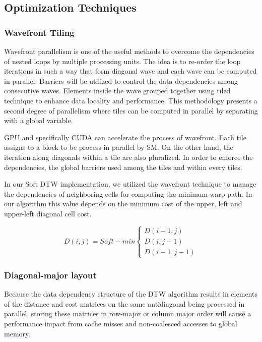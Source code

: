 \documentclass[12pt, letterpaper]{article}
\begin{document}
\subsection{Optimization Techniques}

\subsubsection{Wavefront Tiling}
Wavefront parallelism is one of the useful methods to overcome the dependencies of nested loops 
by multiple processing units. The idea is to re-order the loop iterations in such a way that 
form diagonal wave and each wave can be computed in parallel. Barriers will be utilized to control 
the data dependencies among consecutive waves. Elements inside the wave grouped together using tiled 
technique to enhance data locality and performance. This methodology presents a second degree of parallelism 
where tiles can be computed in parallel by separating with a global variable.

GPU and specifically CUDA can accelerate the process of wavefront. Each tile assigns 
to a block to be process in parallel by SM. On the other hand, the iteration along diagonals within a tile are also
pluralized. In order to enforce the dependencies, the global barriers used among the tiles and within every tiles.\cite{belviranli_peerwave_2015}     

In our Soft DTW implementation, we utilized the wavefront technique to manage the dependencies of neighboring cells for 
computing the minimum warp path. In our algorithm this value depends on the minimum cost of the upper, 
left and upper-left diagonal cell cost.


\begin{equation*}
  D (i,j) = Soft-min
  \begin{cases}
        D(i-1,j) \\
        D(i,j-1)\\
        D(i-1,j-1)   
  \end{cases}
\end{equation*}
\subsubsection{Diagonal-major layout}

Because the data dependency structure of the DTW algorithm results in elements
of the distance and cost matrices on the same antidiagonal being processed in
parallel, storing these matrices in row-major or column major order will cause a
performance impact from cache misses and non-coalesced accesses to global
memory.
\end{document}
